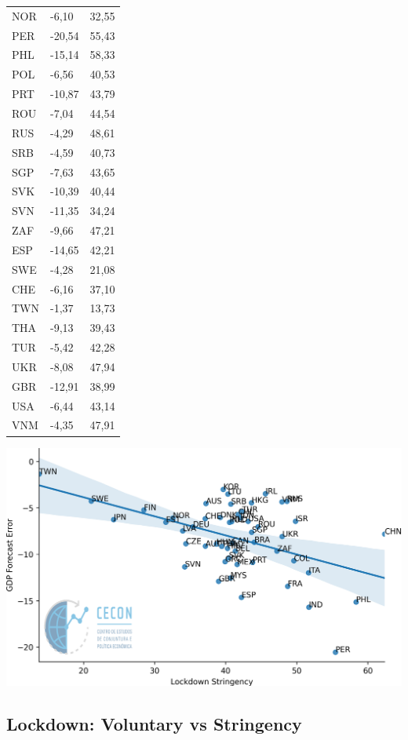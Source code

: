 \documentclass{SelfArx}
\begin{document}
\begin{table}[htbp]
\begin{tabular}{lll}
NOR & -6,10 & 32,55\\
PER & -20,54 & 55,43\\
PHL & -15,14 & 58,33\\
POL & -6,56 & 40,53\\
PRT & -10,87 & 43,79\\
ROU & -7,04 & 44,54\\
RUS & -4,29 & 48,61\\
SRB & -4,59 & 40,73\\
SGP & -7,63 & 43,65\\
SVK & -10,39 & 40,44\\
SVN & -11,35 & 34,24\\
ZAF & -9,66 & 47,21\\
ESP & -14,65 & 42,21\\
SWE & -4,28 & 21,08\\
CHE & -6,16 & 37,10\\
TWN & -1,37 & 13,73\\
THA & -9,13 & 39,43\\
TUR & -5,42 & 42,28\\
UKR & -8,08 & 47,94\\
GBR & -12,91 & 38,99\\
USA & -6,44 & 43,14\\
VNM & -4,35 & 47,91\\
\hline
\end{tabular}
\end{table}


\begin{center}
\includegraphics[width=.9\linewidth]{./figs/IMF/GDP_Lockdown.png}
\end{center}



\subsection*{Lockdown: Voluntary vs Stringency}
\label{sec:org77c7159}
\end{document}
